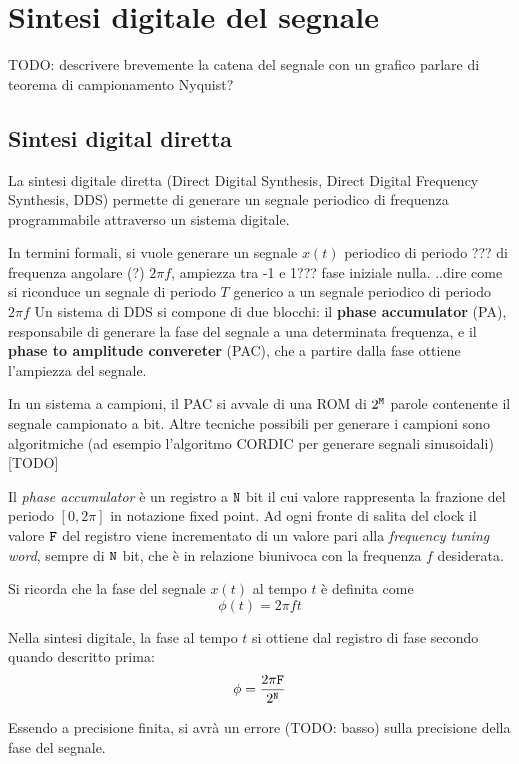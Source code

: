 \DeclarePairedDelimiter\floor{\lfloor}{\rfloor}

\chapter{Sintesi digitale del segnale}

TODO: descrivere brevemente la catena del segnale con un grafico
parlare di teorema di campionamento Nyquist?

\section{Sintesi digital diretta}
La sintesi digitale diretta (Direct Digital Synthesis, Direct Digital Frequency Synthesis, DDS) permette di generare un segnale periodico di frequenza programmabile attraverso un sistema digitale.

In termini formali, si vuole generare un segnale $x(t)$ periodico di periodo ??? di frequenza angolare (?) $2\pi f$, ampiezza tra -1 e 1??? fase iniziale nulla.
..dire come si riconduce un segnale di periodo $T$ generico a un segnale
periodico di periodo $2\pi f$ 
Un sistema di DDS si compone di due blocchi: il \textbf{phase accumulator} (PA), responsabile di generare la fase del segnale a una determinata frequenza, e il \textbf{phase to amplitude convereter} (PAC), che a partire dalla fase ottiene l'ampiezza del segnale.

In un sistema a campioni, il PAC si avvale di una ROM di $2^{\texttt{M}}$ parole contenente il segnale campionato a  bit.
Altre tecniche possibili per generare i campioni sono algoritmiche (ad esempio l'algoritmo CORDIC per generare segnali sinusoidali) [TODO]

Il \textit{phase accumulator} è un registro a $\texttt{N}$ bit il cui valore rappresenta la frazione del periodo $[0, 2\pi]$ in notazione
fixed point. Ad ogni fronte di salita del clock il valore $\texttt{F}$ del registro viene incrementato di un valore pari alla \textit{frequency tuning word},
sempre di $\texttt{N}$ bit, che è in relazione biunivoca con la frequenza $f$ desiderata.

Si ricorda che la fase del segnale $x(t)$ al tempo $t$ è definita come
\[
\phi(t) = 2\pi f t
\]

Nella sintesi digitale, la fase al tempo $t$ si ottiene dal registro di fase secondo quando descritto prima:
\[
\phi = \frac{2\pi \texttt{F}}{2^{\texttt{N}}}
\]

Essendo  a precisione finita, si avrà un errore (TODO: basso) sulla precisione della fase del segnale.

